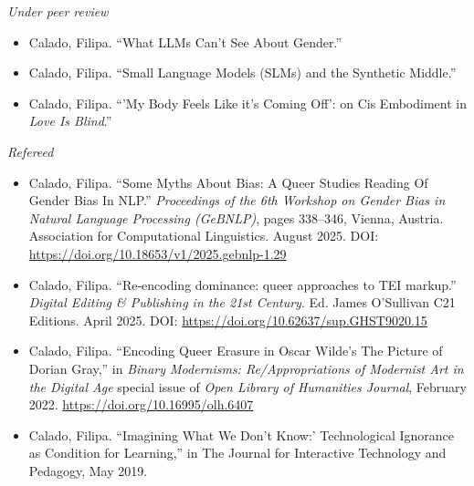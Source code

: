 \documentclass[a4paper,11pt]{article}
\begin{document}
\emph{Under peer review}
\begin{itemize}
\item Calado, Filipa. ``What LLMs Can't See About Gender.''
\item Calado, Filipa. ``Small Language Models (SLMs) and the Synthetic
Middle.''
\item Calado, Filipa. ``'My Body Feels Like it’s Coming Off': on Cis
Embodiment in \emph{Love Is Blind}.''
\end{itemize}

\emph{Refereed}
\begin{itemize}
\item Calado, Filipa. ``Some Myths About Bias: A Queer Studies Reading Of
Gender Bias In NLP.'' \emph{Proceedings of the 6th Workshop on Gender
Bias in Natural Language Processing (GeBNLP)}, pages 338–346,
Vienna, Austria. Association for Computational Linguistics.
August 2025. DOI: \url{https://doi.org/10.18653/v1/2025.gebnlp-1.29}
\item Calado, Filipa. ``Re-encoding dominance: queer approaches to TEI
markup.'' \emph{Digital Editing \& Publishing in the 21st Century}. Ed.
James O'Sullivan C21 Editions. April 2025. DOI:
\url{https://doi.org/10.62637/sup.GHST9020.15}
\item Calado, Filipa. ``Encoding Queer Erasure in Oscar Wilde's The
Picture of Dorian Gray,'' in \emph{Binary Modernisms: Re/Appropriations
of Modernist Art in the Digital Age} special issue of \emph{Open Library
of Humanities Journal}, February 2022.
\url{https://doi.org/10.16995/olh.6407}
\item Calado, Filipa. ``Imagining What We Don’t Know:' Technological
Ignorance as Condition for Learning,'' in The Journal for Interactive
Technology and Pedagogy, May 2019.
\end{itemize}
\end{document}
